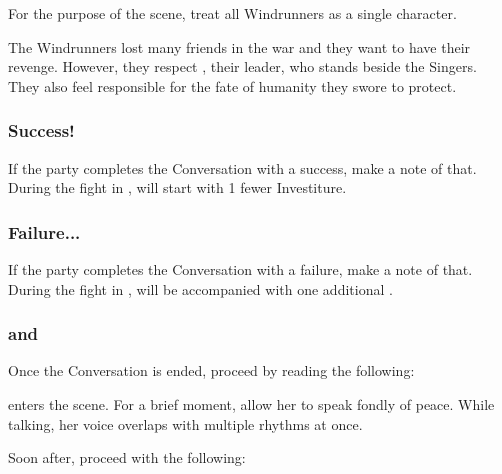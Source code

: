 For the purpose of the scene, treat all Windrunners as a single character. 

The Windrunners lost many friends in the war and they want to have their revenge. However, they respect \npcGarith{}, their leader, who stands beside the Singers. They also feel responsible for the fate of humanity they swore to protect.


\subsubsection{Success!}

If the party completes the Conversation with a success, make a note of that. During the fight in , \enemyMishram{} will start with 1 fewer Investiture.

\subsubsection{Failure...}

If the party completes the Conversation with a failure, make a note of that. During the fight in , \enemyMishram{} will be accompanied with one additional \enemySingerWarform{}.


\subsubsection{\npcMishram{} and \npcMelishi{}}

Once the Conversation is ended, proceed by reading the following:


\npcMishram{} enters the scene. For a brief moment, allow her to speak fondly of peace. While talking, her voice overlaps with multiple rhythms at once.

Soon after, proceed with the following:


